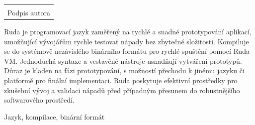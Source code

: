 \documentclass[12pt, a4paper,
twoside,        %
openright
]{report}
\newcommand\datumOdevzdani{1. 1. 2024} %
\begin{document}
	


	\vspace*{0.7\textheight} %
	\vfill
	\noindent{V Opavě \datumOdevzdani\\}
	\noindent
	\begin{minipage}{\linewidth}
		\hspace{9.5cm} 
		\begin{tabular}{@{}p{6cm}@{}}
			\dotfill \\
			Podpis autora
		\end{tabular}
	\end{minipage}
	
	\clearpage %


	\noindent 
	Ruda je programovací jazyk zaměřený na rychlé a snadné prototypování aplikací, umožňující vývojářům rychle testovat nápady bez zbytečné složitosti. Kompiluje se do systémově nezávislého binárního formátu pro rychlé spuštění pomocí Ruda VM. Jednoduchá syntaxe a vestavěné nástroje usnadňují vytváření prototypů. Důraz je kladen na fázi prototypování, s možností přechodu k jinému jazyku či platformě pro finální implementaci. Ruda poskytuje efektivní prostředky pro zkušební vývoj a validaci nápadů před případným přesunem do robustnějšího softwarového prostředí.
	
	\vspace{18pt}
	
	
	\noindent Jazyk, kompilace, binární formát
	
	\vspace{18pt}
	
	\clearpage


	
\end{document}
